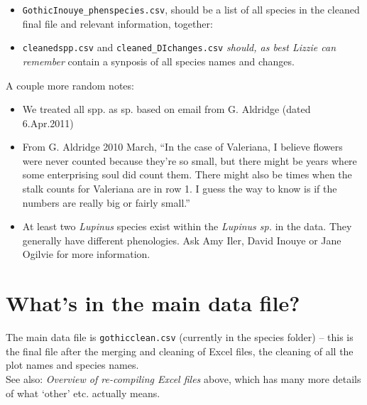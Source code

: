 \documentclass[11pt,a4paper]{article}
\begin{document}
\begin{itemize}
\item \verb|GothicInouye_phenspecies.csv|, should be
a list of all species in the cleaned final file and relevant
information, together: 
\item \verb|cleanedspp.csv| and \verb|cleaned_DIchanges.csv| \emph{should,
  as best Lizzie can remember} contain a synposis of all species names
and changes.
\end{itemize}

A couple more random notes:
\begin{itemize}
\item We treated all spp. as sp. based on email from G. Aldridge (dated 6.Apr.2011)
\item From G. Aldridge 2010 March, ``In the case of Valeriana, I
  believe flowers were never counted because they're so small, but
  there might be years where some enterprising soul did count
  them. There might also be times when the stalk counts for Valeriana
  are in row 1. I guess the way to know is if the numbers are really
  big or fairly small.''
\item At least two \emph{Lupinus} species exist within the
  \emph{Lupinus sp.} in the data. They generally have different
  phenologies. Ask Amy Iler, David Inouye or Jane Ogilvie for more information.
\end{itemize}

\section{What's in the main data file?}

The main data file is \verb|gothicclean.csv| (currently in the species
folder) -- this is the final file
after the merging and cleaning of Excel files, the cleaning of all the
plot names and species names. \\

See also: \emph{Overview of re-compiling Excel
files} above, which has many more details of what `other'
etc. actually means.\\
\end{document}

